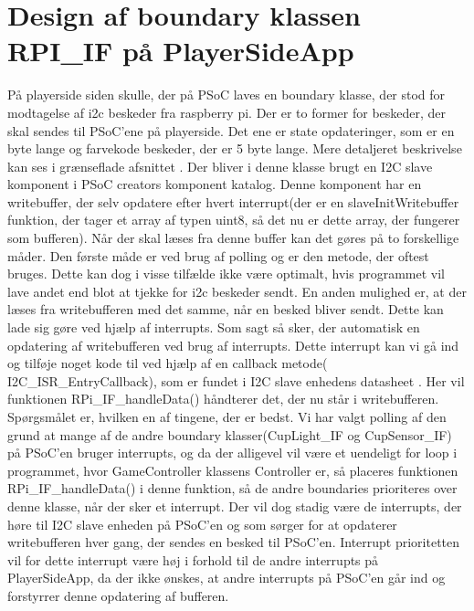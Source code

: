\documentclass[Softwaredesign/Softwaredesign_main.tex]{subfiles}
\begin{document}
\section{Design af boundary klassen RPI\_IF på PlayerSideApp}\label{sec:RPI_IF_design_bilag}
På playerside siden skulle, der på PSoC laves en boundary klasse, der stod for modtagelse af i2c beskeder fra raspberry pi. Der er to former for beskeder, der skal sendes til PSoC'ene på playerside. Det ene er state opdateringer, som er en byte lange og farvekode beskeder, der er 5 byte lange. Mere detaljeret beskrivelse kan ses i grænseflade afsnittet . Der bliver i denne klasse brugt en I2C slave komponent i PSoC creators komponent katalog. Denne komponent har en writebuffer, der selv opdatere efter hvert interrupt(der er en slaveInitWritebuffer funktion, der tager et array af typen uint8, så det nu er dette array, der fungerer som bufferen). Når der skal læses fra denne buffer kan det gøres på to forskellige måder. Den første måde er ved brug af polling og er den metode, der oftest bruges. Dette kan dog i visse tilfælde ikke være optimalt, hvis programmet vil lave andet end blot at tjekke for i2c beskeder sendt. En anden mulighed er, at der læses fra writebufferen med det samme, når en besked bliver sendt. Dette kan lade sig gøre ved hjælp af interrupts. Som sagt så sker, der automatisk en opdatering af writebufferen ved brug af interrupts. Dette interrupt kan vi gå ind og tilføje noget kode til ved hjælp af en callback metode( I2C\_ISR\_EntryCallback), som er fundet i I2C slave enhedens datasheet \autocite{i2c_slave_datasheet}. Her vil funktionen RPi\_IF\_handleData() håndterer det, der nu står i writebufferen. Spørgsmålet er, hvilken en af tingene, der er bedst. Vi har valgt polling af den grund at mange af de andre boundary klasser(CupLight\_IF og CupSensor\_IF) på PSoC'en bruger interrupts, og da der alligevel vil være et uendeligt for loop i programmet, hvor GameController klassens Controller er, så placeres funktionen RPi\_IF\_handleData() i denne funktion, så de andre boundaries prioriteres over denne klasse, når der sker et interrupt. Der vil dog stadig være de interrupts, der høre til I2C slave enheden på PSoC'en og som sørger for at opdaterer writebufferen hver gang, der sendes en besked til PSoC'en. Interrupt prioritetten vil for dette interrupt være høj i forhold til de andre interrupts på PlayerSideApp, da der ikke ønskes, at andre interrupts på PSoC'en går ind og forstyrrer denne opdatering af bufferen. 
\end{document}
